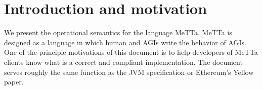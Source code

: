 \section{Introduction and motivation}
We present the operational semantics for the language MeTTa. MeTTa is designed as a language in which human and AGIs write the behavior of AGIs. One of the principle motivations of this document is to help developers of MeTTa clients know what is a correct and compliant implementation. The document serves roughly the same function as the JVM specification or Ethereum's Yellow paper.
